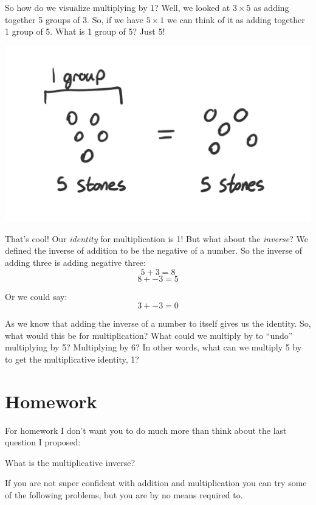 \documentclass{article}
\begin{document}
So how do we visualize multiplying by 1? Well, we looked at $3 \times 5$ as adding together 5 groups of 3. So, if we have $5 \times 1$ we can think of it as adding together 1 group of 5. What is 1 group of 5? Just 5!

\begin{center}
    \includegraphics[scale=0.5]{chap1images/chapter1_draw5.png}
\end{center}

That's cool! Our \textit{identity} for multiplication is 1! But what about the \textit{inverse}? We defined the inverse of addition to be the negative of a number. So the inverse of adding three is adding negative three: 
\[ 5 + 3 = 8 \]
\[ 8 + -3 = 5 \]

Or we could say:
\[ 3 + -3 = 0 \]

As we know that adding the inverse of a number to itself gives us the identity. So, what would this be for multiplication? What could we multiply by to ``undo'' multiplying by 5? Multiplying by 6? In other words, what can we multiply 5 by to get the multiplicative identity, 1? 

\section*{Homework}

For homework I don't want you to do much more than think about the last question I proposed: 
\begin{center}
    What is the multiplicative inverse? 
\end{center}

If you are not super confident with addition and multiplication you can try some of the following problems, but you are by no means required to. 
\end{document}
